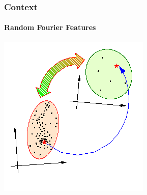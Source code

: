 \documentclass{beamer}
\begin{document}
\begin{frame}
\frametitle{Context}
\framesubtitle{Random Fourier Features}

\begin{center}
\includegraphics[scale=0.7]{space_mapping_2}
\end{center}


\end{frame}
\end{document}
